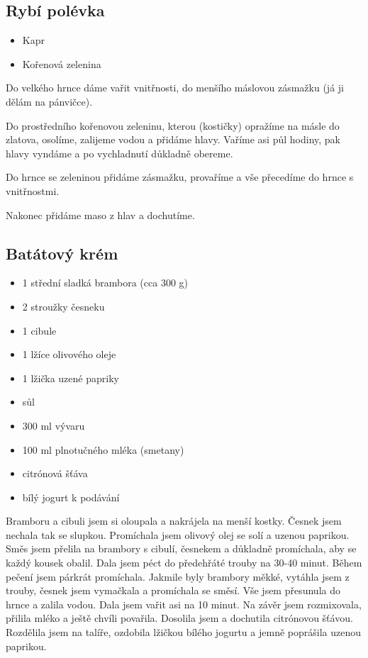 \documentclass[10pt,a4paper]{article}
\newenvironment{myitemize}
{ \begin{itemize}
    \setlength{\itemsep}{0pt}
    \setlength{\parskip}{0pt}
    \setlength{\parsep}{0pt}     }
{ \end{itemize}                  }
\begin{document}
\subsection{Rybí polévka}
\begin{minipage}[t]{0,5\textwidth}
\begin{myitemize} 
\item Kapr
\item Kořenová zelenina
\end{myitemize}
\end{minipage}
\begin{minipage}[t]{0,5\textwidth}
Do velkého hrnce dáme vařit vnitřnosti, do menšího máslovou zásmažku (já ji dělám na pánvičce).

Do prostředního kořenovou zeleninu, kterou (kostičky) opražíme na másle do zlatova, osolíme, zalijeme vodou a přidáme hlavy. Vaříme asi půl hodiny, pak hlavy vyndáme a po vychladnutí důkladně obereme. 

Do hrnce se zeleninou přidáme zásmažku, provaříme a vše přecedíme do hrnce s vnitřnostmi. 

Nakonec přidáme maso z hlav a dochutíme. 
\end{minipage}

\subsection{Batátový krém}
\begin{minipage}[t]{0,5\textwidth}
\begin{myitemize} 
\item 1 střední sladká brambora (cca 300 g)
\item 2 stroužky česneku
\item 1 cibule
\item 1 lžíce olivového oleje
\item 1 lžička uzené papriky
\item sůl
\item 300 ml vývaru
\item 100 ml plnotučného mléka (smetany)
\item citrónová šťáva
\item bílý jogurt k podávání
\end{myitemize}
\end{minipage}
\begin{minipage}[t]{0,5\textwidth}
Bramboru a cibuli jsem si oloupala a nakrájela na menší kostky. Česnek jsem nechala tak se slupkou. Promíchala jsem olivový olej se solí a uzenou paprikou. Směs jsem přelila na brambory s cibulí, česnekem a důkladně promíchala, aby se každý kousek obalil. Dala jsem péct do předehřáté trouby na 30-40 minut. Během pečení jsem párkrát promíchala. Jakmile byly brambory měkké, vytáhla jsem z trouby, česnek jsem vymačkala a promíchala se směsí. Vše jsem přesunula do hrnce a zalila vodou. Dala jsem vařit asi na 10 minut. Na závěr jsem rozmixovala, přilila mléko a ještě chvíli povařila. Dosolila jsem a dochutila citrónovou šťávou. Rozdělila jsem na talíře, ozdobila lžičkou bílého jogurtu a jemně poprášila uzenou paprikou.
\end{minipage}
\end{document}
